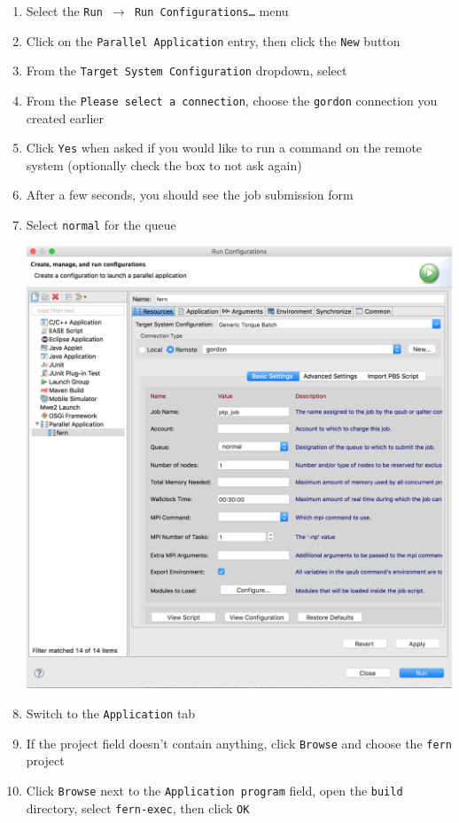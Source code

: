 \begin{enumerate}
  \item Select the \texttt{Run $\rightarrow$ Run Configurations\ldots} menu
  \item Click on the \texttt{Parallel Application} entry, then click the
  \texttt{New} button
  \item From the \texttt{Target System Configuration} dropdown, select
  \item From the \texttt{Please select a connection}, choose the \texttt{gordon}
  connection you created earlier
  \item Click \texttt{Yes} when asked if you would like to run a command on the
  remote system (optionally check the box to not ask again)
  \item After a few seconds, you should see the job submission form
  \item Select \texttt{normal} for the queue
  
  \begin{center} \includegraphics[width=\textwidth]{figures/runConfiguration}
  \end{center}
  
  \item Switch to the \texttt{Application} tab
  \item If the project field doesn't contain anything, click \texttt{Browse} and
  choose the \texttt{fern} project
  \item Click \texttt{Browse} next to the \texttt{Application program} field,
  open the \texttt{build} directory, select \texttt{fern-exec}, then click
  \texttt{OK}
  

\end{enumerate}
